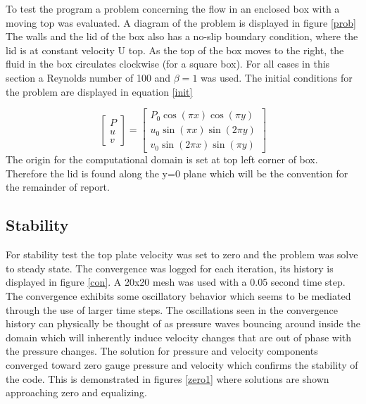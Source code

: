 \documentclass[paper=a4, fontsize=11pt, abstract=on]{scrartcl}
\numberwithin{equation}{section}		%
\numberwithin{figure}{section}			%
\numberwithin{table}{section}				%
\begin{document}
To test the program a problem concerning the flow in an enclosed box with a
moving top was evaluated. A diagram of the problem is displayed in figure \ref{prob} The walls and the lid of the box also has a no-slip boundary condition, where the lid is at constant velocity U top. As the top of the box moves to the right, the fluid in the box circulates clockwise (for a square box). For all cases in this section a Reynolds number of 100 and $\beta = 1$ was used. The initial conditions for the problem are displayed in equation \ref{init}

\begin{equation}
\label{init}
\begin{bmatrix}
   P    \\
   u  \\
    v
\end{bmatrix} =
\begin{bmatrix}
   P_0\cos(\pi x)\cos(\pi y)   \\
   u_0\sin(\pi x)\sin(2\pi y)  \\
    v_0\sin(2\pi x)\sin(\pi y)
\end{bmatrix}
\end{equation} 
The origin for the computational domain is set at top left corner of box. Therefore the lid is found along the y=0 plane which will be the convention for the remainder of report.
\subsection{Stability}
For stability test the top plate velocity was set to zero and the problem was solve to steady state. The convergence was logged for each iteration, its history is displayed in figure \ref{con}. A 20x20 mesh was used with a 0.05 second time step. The convergence exhibits some oscillatory behavior which seems to be mediated through the use of larger time steps. The oscillations seen in the convergence history can physically be thought of as pressure waves bouncing around inside the domain which will inherently induce velocity changes that are out of phase with the pressure changes. The solution for pressure and velocity components converged toward zero gauge pressure and velocity which confirms the stability of the code. This is demonstrated in figures \ref{zero1} where solutions are shown approaching zero and equalizing. 
\end{document}
